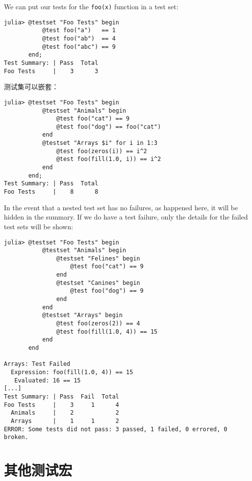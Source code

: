 We can put our tests for the \texttt{foo(x)} function in a test set:




\begin{verbatim}
julia> @testset "Foo Tests" begin
           @test foo("a")   == 1
           @test foo("ab")  == 4
           @test foo("abc") == 9
       end;
Test Summary: | Pass  Total
Foo Tests     |    3      3
\end{verbatim}



测试集可以嵌套：




\begin{verbatim}
julia> @testset "Foo Tests" begin
           @testset "Animals" begin
               @test foo("cat") == 9
               @test foo("dog") == foo("cat")
           end
           @testset "Arrays $i" for i in 1:3
               @test foo(zeros(i)) == i^2
               @test foo(fill(1.0, i)) == i^2
           end
       end;
Test Summary: | Pass  Total
Foo Tests     |    8      8
\end{verbatim}



In the event that a nested test set has no failures, as happened here, it will be hidden in the summary. If we do have a test failure, only the details for the failed test sets will be shown:




\begin{verbatim}
julia> @testset "Foo Tests" begin
           @testset "Animals" begin
               @testset "Felines" begin
                   @test foo("cat") == 9
               end
               @testset "Canines" begin
                   @test foo("dog") == 9
               end
           end
           @testset "Arrays" begin
               @test foo(zeros(2)) == 4
               @test foo(fill(1.0, 4)) == 15
           end
       end

Arrays: Test Failed
  Expression: foo(fill(1.0, 4)) == 15
   Evaluated: 16 == 15
[...]
Test Summary: | Pass  Fail  Total
Foo Tests     |    3     1      4
  Animals     |    2            2
  Arrays      |    1     1      2
ERROR: Some tests did not pass: 3 passed, 1 failed, 0 errored, 0 broken.
\end{verbatim}



\hypertarget{13684669007939877444}{}


\section{其他测试宏}



